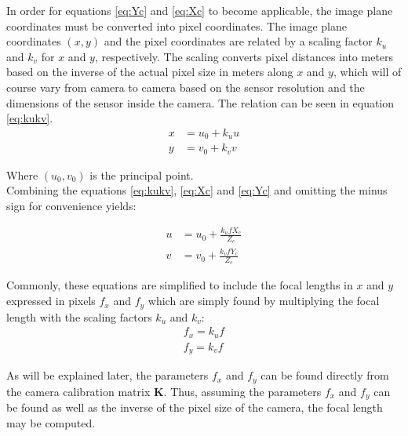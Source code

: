 In order for equations \ref{eq:Yc} and \ref{eq:Xc} to become applicable, the image plane coordinates must be converted into pixel coordinates. The image plane coordinates $(x,y)$ and the pixel coordinates are related by a scaling factor $k_{u}$ and $k_{v}$ for $x$ and $y$, respectively. The scaling converts pixel distances into meters based on the inverse of the actual pixel size in meters along $x$ and $y$, which will of course vary from camera to camera based on the sensor resolution and the dimensions of the sensor inside the camera. The relation can be seen in equation \ref{eq:kukv}.
\begin{equation}
\label{eq:kukv}
    \begin{split}
        x & = u_{0} + k_{u} u\\
        y & = v_{0} + k_{v} v
    \end{split}
\end{equation}

Where $(u_{0},v_{0})$ is the principal point.\\ 

Combining the equations \ref{eq:kukv}, \ref{eq:Xc} and \ref{eq:Yc} and omitting the minus sign for convenience yields:

\begin{equation}
\label{eq:uv}
    \begin{split}
        u & = u_{0}+\frac{k_{u} f X_{c}}{Z_{c}} \\
        v & = v_{0}+\frac{k_{v} f Y_{c}}{Z_{c}}
    \end{split}
\end{equation}

Commonly, these equations are simplified to include the focal lengths in $x$ and $y$ expressed in pixels $f_{x}$ and $f_{y}$ which are simply found by multiplying the focal length with the scaling factors $k_{u}$ and $k_{v}$:
\begin{equation}
\label{eq:fxfy}
    \begin{split}
        f_{x} = k_{u} f\\
        f_{y} = k_{v} f
    \end{split}
\end{equation}

As will be explained later, the parameters $f_{x}$ and $f_{y}$ can be found directly from the camera calibration matrix $\boldsymbol{K}$. Thus, assuming the parameters $f_{x}$ and $f_{y}$ can be found as well as the inverse of the pixel size of the camera, the focal length may be computed.\\

